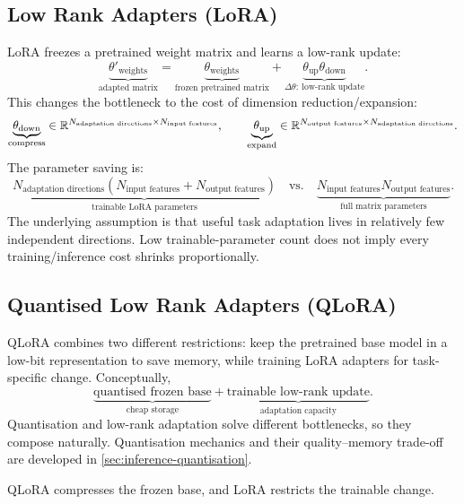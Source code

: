 \subsection{Low Rank Adapters (LoRA)}
\label{sec:adaptation-lora-a-parameter-efficient-adaptation-mechanism}
LoRA freezes a pretrained weight matrix and learns a low-rank update:
\[
    \underbrace{\theta'_{\text{weights}}}_{\text{adapted matrix}}
    =
    \underbrace{\theta_{\text{weights}}}_{\text{frozen pretrained matrix}}
    +
    \underbrace{\theta_{\text{up}}\theta_{\text{down}}}_{\Delta\theta:\ \text{low-rank update}}.
\]
This changes the bottleneck to the cost of dimension reduction/expansion:
\[
    \underbrace{\theta_{\text{down}}}_{\text{compress}}
    \in\mathbb R^{N_{\text{adaptation directions}}\times N_{\text{input features}}},
    \qquad
    \underbrace{\theta_{\text{up}}}_{\text{expand}}
    \in\mathbb R^{N_{\text{output features}}\times N_{\text{adaptation directions}}}.
\]
The parameter saving is:
\[
    \underbrace{N_{\text{adaptation directions}}
    \left(N_{\text{input features}}+N_{\text{output features}}\right)}_{\text{trainable LoRA parameters}}
    \quad\text{vs.}\quad
    \underbrace{N_{\text{input features}}N_{\text{output features}}}_{\text{full matrix parameters}}.
\]
The underlying assumption is that useful task adaptation lives in relatively few independent directions.
Low trainable-parameter count does not imply every training/inference cost shrinks proportionally.


\subsection{Quantised Low Rank Adapters (QLoRA)}
\label{subsec:adaptation-qlora}
QLoRA combines two different restrictions: keep the pretrained base model in a low-bit representation to save memory, while training LoRA adapters for task-specific change.
Conceptually,
\[
    \underbrace{\text{quantised frozen base}}_{\text{cheap storage}}
    +
    \underbrace{\text{trainable low-rank update}}_{\text{adaptation capacity}}.
\]
Quantisation and low-rank adaptation solve different bottlenecks, so they compose naturally.
Quantisation mechanics and their quality--memory trade-off are developed in \cref{sec:inference-quantisation}.

\begin{calloutmemoryhook}
    QLoRA compresses the frozen base, and LoRA restricts the trainable change.
\end{calloutmemoryhook}


